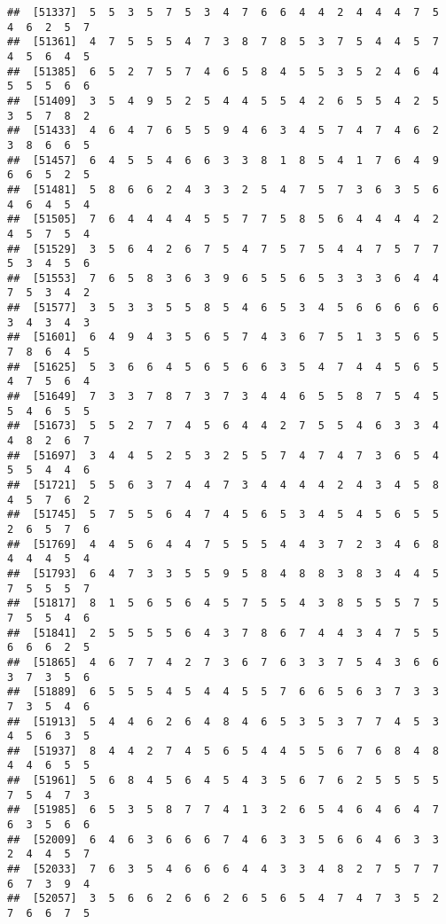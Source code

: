 \documentclass[
]{book}
\begin{document}
\begin{verbatim}
##  [51337]  5  5  3  5  7  5  3  4  7  6  6  4  4  2  4  4  4  7  5  4  6  2  5  7
##  [51361]  4  7  5  5  5  4  7  3  8  7  8  5  3  7  5  4  4  5  7  4  5  6  4  5
##  [51385]  6  5  2  7  5  7  4  6  5  8  4  5  5  3  5  2  4  6  4  5  5  5  6  6
##  [51409]  3  5  4  9  5  2  5  4  4  5  5  4  2  6  5  5  4  2  5  3  5  7  8  2
##  [51433]  4  6  4  7  6  5  5  9  4  6  3  4  5  7  4  7  4  6  2  3  8  6  6  5
##  [51457]  6  4  5  5  4  6  6  3  3  8  1  8  5  4  1  7  6  4  9  6  6  5  2  5
##  [51481]  5  8  6  6  2  4  3  3  2  5  4  7  5  7  3  6  3  5  6  4  6  4  5  4
##  [51505]  7  6  4  4  4  4  5  5  7  7  5  8  5  6  4  4  4  4  2  4  5  7  5  4
##  [51529]  3  5  6  4  2  6  7  5  4  7  5  7  5  4  4  7  5  7  7  5  3  4  5  6
##  [51553]  7  6  5  8  3  6  3  9  6  5  5  6  5  3  3  3  6  4  4  7  5  3  4  2
##  [51577]  3  5  3  3  5  5  8  5  4  6  5  3  4  5  6  6  6  6  6  3  4  3  4  3
##  [51601]  6  4  9  4  3  5  6  5  7  4  3  6  7  5  1  3  5  6  5  7  8  6  4  5
##  [51625]  5  3  6  6  4  5  6  5  6  6  3  5  4  7  4  4  5  6  5  4  7  5  6  4
##  [51649]  7  3  3  7  8  7  3  7  3  4  4  6  5  5  8  7  5  4  5  5  4  6  5  5
##  [51673]  5  5  2  7  7  4  5  6  4  4  2  7  5  5  4  6  3  3  4  4  8  2  6  7
##  [51697]  3  4  4  5  2  5  3  2  5  5  7  4  7  4  7  3  6  5  4  5  5  4  4  6
##  [51721]  5  5  6  3  7  4  4  7  3  4  4  4  4  2  4  3  4  5  8  4  5  7  6  2
##  [51745]  5  7  5  5  6  4  7  4  5  6  5  3  4  5  4  5  6  5  5  2  6  5  7  6
##  [51769]  4  4  5  6  4  4  7  5  5  5  4  4  3  7  2  3  4  6  8  4  4  4  5  4
##  [51793]  6  4  7  3  3  5  5  9  5  8  4  8  8  3  8  3  4  4  5  7  5  5  5  7
##  [51817]  8  1  5  6  5  6  4  5  7  5  5  4  3  8  5  5  5  7  5  7  5  5  4  6
##  [51841]  2  5  5  5  5  6  4  3  7  8  6  7  4  4  3  4  7  5  5  6  6  6  2  5
##  [51865]  4  6  7  7  4  2  7  3  6  7  6  3  3  7  5  4  3  6  6  3  7  3  5  6
##  [51889]  6  5  5  5  4  5  4  4  5  5  7  6  6  5  6  3  7  3  3  7  3  5  4  6
##  [51913]  5  4  4  6  2  6  4  8  4  6  5  3  5  3  7  7  4  5  3  4  5  6  3  5
##  [51937]  8  4  4  2  7  4  5  6  5  4  4  5  5  6  7  6  8  4  8  4  4  6  5  5
##  [51961]  5  6  8  4  5  6  4  5  4  3  5  6  7  6  2  5  5  5  5  7  5  4  7  3
##  [51985]  6  5  3  5  8  7  7  4  1  3  2  6  5  4  6  4  6  4  7  6  3  5  6  6
##  [52009]  6  4  6  3  6  6  6  7  4  6  3  3  5  6  6  4  6  3  3  2  4  4  5  7
##  [52033]  7  6  3  5  4  6  6  6  4  4  3  3  4  8  2  7  5  7  7  6  7  3  9  4
##  [52057]  3  5  6  6  2  6  6  2  6  5  6  5  4  7  4  7  3  5  2  7  6  6  7  5

\end{verbatim}
\end{document}
